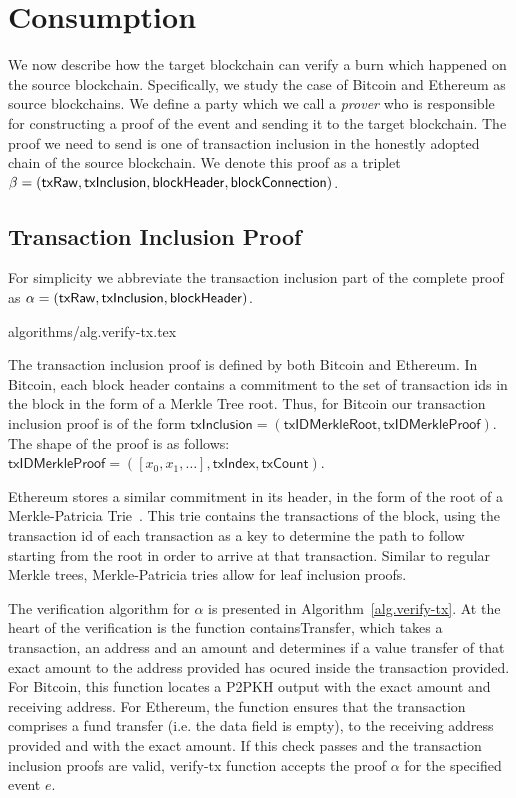 \section{Consumption}

We now describe how the target blockchain can verify a burn which happened on the source blockchain. Specifically, we study the case of Bitcoin and Ethereum as source blockchains. We define a party which we call a \emph{prover} who is responsible for constructing a proof of the event and sending it to the target blockchain. The proof we need to send is one of transaction inclusion in the honestly adopted chain of the source blockchain. We denote this proof as a triplet $\beta = \sf(txRaw, txInclusion, blockHeader, blockConnection)$.

\subsection{Transaction Inclusion Proof}

For simplicity we abbreviate the transaction inclusion part of the complete proof as $\alpha = \sf(txRaw, txInclusion, blockHeader)$.

{algorithms/alg.verify-tx.tex}

The transaction inclusion proof is defined by both Bitcoin and Ethereum. In Bitcoin, each block header contains a commitment to the set of transaction ids in the block in the form of a Merkle Tree root. Thus, for Bitcoin our transaction inclusion proof is of the form $\mathsf{txInclusion} = (\mathsf{txIDMerkleRoot}, \mathsf{txIDMerkleProof})$. The shape of the proof is as follows: $\mathsf{txIDMerkleProof} = ([x_0, x_1, \dots], \mathsf{txIndex}, \mathsf{txCount})$.

Ethereum stores a similar commitment in its header, in the form of the root of a Merkle-Patricia Trie~\cite{wood2014ethereum}. This trie contains the transactions of the block, using the transaction id of each transaction as a key to determine the path to follow starting from the root in order to arrive at that transaction. Similar to regular Merkle trees, Merkle-Patricia tries allow for leaf inclusion proofs.

The verification algorithm for $\alpha$ is presented in Algorithm~\ref{alg.verify-tx}. At the heart of the verification is the function \textsf{containsTransfer}, which takes a transaction, an address and an amount and determines if a value transfer of that exact amount to the address provided has ocured inside the transaction provided. For Bitcoin, this function locates a P2PKH output with the exact amount and receiving address. For Ethereum, the function ensures that the transaction comprises a fund transfer (i.e. the \textsf{data} field is empty), to the receiving address provided and with the exact amount. If this check passes and the transaction inclusion proofs are valid, \textsf{verify-tx} function accepts the proof $\alpha$ for the specified event $e$.

